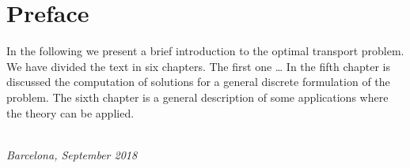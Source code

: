 \chapter*{Preface}

In the following we present a brief introduction to the optimal transport problem. We have divided the text in six chapters. The first one \ldots
In the fifth chapter is discussed the computation of solutions for a general discrete formulation of the problem. 
The sixth chapter is a general description of some applications where the theory can be applied.
\begin{flushright}
{\makeatletter\itshape
    \@author \\
    Barcelona, September 2018
\makeatother}
\end{flushright}

